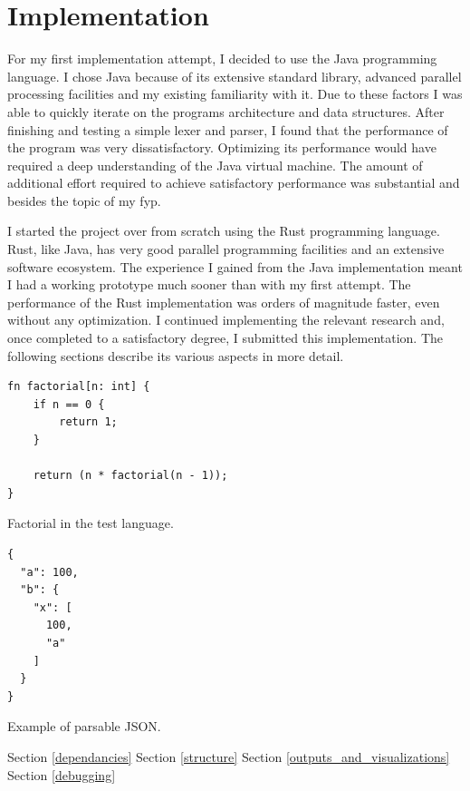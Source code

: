 \chapter{Implementation} \label{implementation}

For my first implementation attempt, I decided to use the Java programming
language. I chose Java because of its extensive standard library, advanced
parallel processing facilities and my existing familiarity with it. Due to
these factors I was able to quickly iterate on the programs architecture and
data structures. After finishing and testing a simple lexer and parser, I
found that the performance of the program was very dissatisfactory. Optimizing
its performance would have required a deep understanding of the Java virtual
machine. The amount of additional effort required to achieve satisfactory
performance was substantial and besides the topic of my \gls{fyp}.

I started the project over from scratch using the Rust programming language.
Rust, like Java, has very good parallel programming facilities and an extensive
software ecosystem. The experience I gained from the Java implementation meant I
had a working prototype much sooner than with my first attempt. The performance
of the Rust implementation was orders of magnitude faster, even without any
optimization. I continued implementing the relevant research and, once completed
to a satisfactory degree, I submitted this implementation. The following
sections describe its various aspects in more detail.

\begin{listing}[H]
\begin{verbatim}
fn factorial[n: int] {
    if n == 0 {
        return 1;
    } 

    return (n * factorial(n - 1));
}
\end{verbatim}
\caption{Factorial in the test language.}
\label{lst:example}
\end{listing}

\begin{listing}[H]
\begin{verbatim}
{
  "a": 100,
  "b": {
    "x": [
      100,
      "a"
    ]
  }
}
\end{verbatim}
\caption{Example of parsable JSON.}
\hrulefill
\label{lst:example}
\end{listing}

Section \ref{dependancies}
\newline \newline
Section \ref{structure}
\newline \newline
Section \ref{outputs_and_visualizations}
\newline \newline
Section \ref{debugging}

